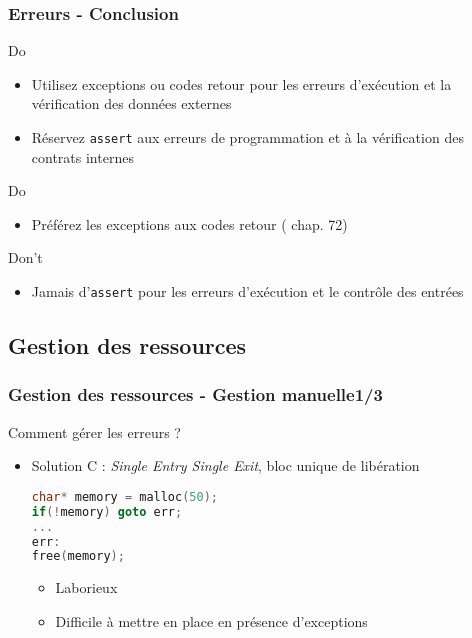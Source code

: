 \documentclass[C++.tex]{subfiles}
\begin{document}
\begin{frame}
	\frametitle{Erreurs - Conclusion}
	\begin{exampleblock}{Do}
		\begin{itemize}
			\item Utilisez exceptions ou codes retour pour les erreurs d'exécution et la vérification des données externes
			\item Réservez \lstinline|assert| aux erreurs de programmation et à la vérification des contrats internes
		\end{itemize}
	\end{exampleblock}

	\begin{exampleblock}{Do}
		\begin{itemize}
			\item Préférez les exceptions aux codes retour (\cite{coding} chap. 72)
		\end{itemize}
	\end{exampleblock}

	\begin{alertblock}{Don't}
		\begin{itemize}
			\item Jamais d'\lstinline|assert| pour les erreurs d'exécution et le contrôle des entrées
		\end{itemize}
	\end{alertblock}
\end{frame}

\subsection*{Gestion des ressources}
\begin{frame}[fragile]
	\frametitle{Gestion des ressources - Gestion manuelle\titlehfill{}1/3}
	\begin{alertblock}{}
		Comment gérer les erreurs ?
	\end{alertblock}

	\begin{itemize}
		\item Solution C : \textit{Single Entry Single Exit}, bloc unique de libération

		\begin{lstlisting}[language=C++]
char* memory = malloc(50);
if(!memory) goto err;
...
err:
free(memory);\end{lstlisting}

		\pause

		\begin{itemize}
			\item Laborieux
			\item Difficile à mettre en place en présence d'exceptions
		\end{itemize}
	\end{itemize}
\end{frame}
\end{document}
